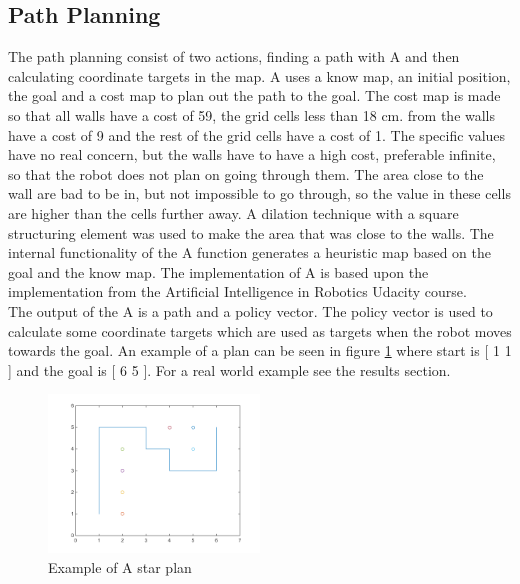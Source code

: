 \subsection{Path Planning}
The path planning consist of two actions, finding a path with A\text{*} and then calculating coordinate targets in the map. 
A\text{*} uses a know map, an initial position, the goal and a cost map to plan out the path to the goal. 
The cost map is made so that all walls have a cost of 59, the grid cells less than 18 cm. from the walls have a cost of 9 and the rest of the grid cells have a cost of 1. The specific values have no real concern, but the walls have to have a high cost, preferable infinite, so that the robot does not plan on going through them. The area close to the wall are bad to be in, but not impossible to go through, so the value in these cells are higher than the cells further away. A dilation technique with a square structuring element was used to make the area that was close to the walls.
The internal functionality of the A\text{*} function generates a heuristic map based on the goal and the know map. The implementation of A\text{*} is based upon the implementation from the Artificial Intelligence in Robotics Udacity course\citep{AIROK}.\\
The output of the A\text{*} is a path and a policy vector. The policy vector is used to calculate some coordinate targets which are used as targets when the robot moves towards the goal. An example of a plan can be seen in figure \ref{fig:exastar} where start is [ 1 1 ] and the goal is [ 6 5 ]. For a real world example see the results section.
\begin{figure}[H]
\centering
\includegraphics[width=0.5\textwidth]{billeder/exampleastar}
\caption{Example of A star plan}
\label{fig:exastar}
\end{figure}